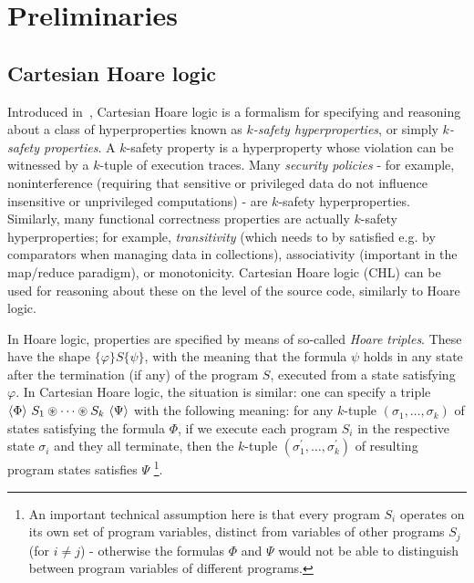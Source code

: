 \section{Preliminaries}



\subsection{Cartesian Hoare logic}

Introduced in~\cite{SousaD16}, Cartesian Hoare logic is a formalism for specifying and reasoning about
a class of hyperproperties known as \emph{$k$-safety hyperproperties}, or simply
\emph{$k$-safety properties}.
A $k$-safety property is a hyperproperty whose violation can be witnessed by a $k$-tuple of execution traces.
Many \emph{security policies} - for example, noninterference (requiring that sensitive or privileged data
do not influence insensitive or unprivileged computations) - are $k$-safety hyperproperties.
Similarly, many functional correctness properties are actually $k$-safety hyperproperties;
for example, \emph{transitivity} (which needs to by satisfied e.g. by comparators when managing data
in collections), associativity (important in the map/reduce paradigm), or monotonicity.
Cartesian Hoare logic (CHL) can be used for reasoning about these on the level of the source code,
similarly to Hoare logic.

In Hoare logic, properties are specified by means of so-called \emph{Hoare triples}.
These have the shape $\{ \varphi \} S \{ \psi \}$, with the meaning that
the formula $\psi$ holds in any state after the termination (if any) of the program $S$,
executed from a state satisfying $\varphi$.
In Cartesian Hoare logic, the situation is similar: one can specify a triple
$\langle \Phi \rangle\ S_1 \circledast \cdots \circledast S_k\ \langle \Psi \rangle$
with the following meaning: for any $k$-tuple $(\sigma_1,\ldots,\sigma_k)$ of states
satisfying the formula $\Phi$, if we execute each program $S_i$ in the respective state $\sigma_i$ and they all terminate,
then the $k$-tuple $(\sigma_1^\prime,\ldots,\sigma_k^\prime)$ of resulting program states satisfies $\Psi$ \footnote{An
important technical assumption here is that every program $S_i$ operates on its own set of program variables,
distinct from variables of other programs $S_j$ (for $i \not = j$) - otherwise the formulas $\Phi$ and $\Psi$
would not be able to distinguish between program variables of different programs.}.


